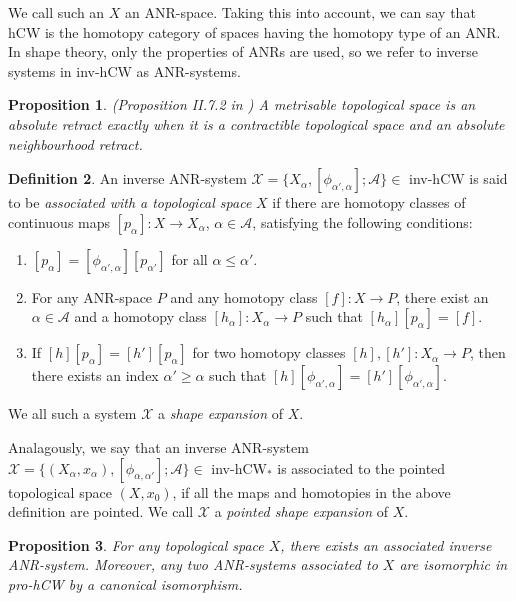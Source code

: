 \documentclass[a4paper,11pt]{article}
\theoremstyle{definition}
\newtheorem{definition}{Definition}[section]
\theoremstyle{plain}
\newtheorem{prop}[definition]{Proposition}
\theoremstyle{remark}
\begin{document}
{We call such an $X$ an ANR-space. Taking this into account, we can say that hCW is the homotopy category of spaces having the homotopy type of an ANR. In shape theory, only the properties of ANRs are used, so we refer to inverse systems in inv-hCW as ANR-systems. 

\begin{prop} (Proposition II.7.2 in \cite{sze1965theory}) A metrisable topological space is an absolute retract exactly when it is a contractible topological space and an absolute neighbourhood retract. 
\end{prop}

\begin{definition} \label{systemassocX} An inverse ANR-system $\mathcal{X} = \{X_{\alpha}, [\phi_{\alpha',\alpha}]; \mathcal{A}\} \in$ inv-hCW is said to be \textit{associated with a topological space} $X$ if there are homotopy classes of continuous maps $[p_{\alpha}]: X\rightarrow X_{\alpha}$, $\alpha\in \mathcal{A}$, satisfying the following conditions:
\begin{enumerate}
\item $[p_{\alpha}] = [\phi_{\alpha',\alpha}] [p_{\alpha'}]$ for all $\alpha \leq \alpha'$.
\item For any ANR-space $P$ and any homotopy class $[f]: X\rightarrow P$, there exist an $\alpha\in  \mathcal{A}$ and a homotopy class $[h_{\alpha}]: X_{\alpha}\rightarrow P$ such that $[h_{\alpha}][p_{\alpha}] = [f]$. 
\item If $[h] [p_{\alpha}] = [h'] [p_{\alpha}]$ for two homotopy classes $[h],[h']: X_{\alpha}\rightarrow P$, then there exists an index $\alpha'\geq \alpha$ such that $[h][\phi_{\alpha',\alpha}] = [h'] [\phi_{\alpha',\alpha}]$. 
\end{enumerate} 
We all such a system $\mathcal{X}$ a \textit{shape expansion} of $X$.
\end{definition}


Analagously, we say that an inverse ANR-system $\mathcal{X} = \{(X_{\alpha},x_{\alpha}), [\phi_{\alpha,\alpha'}]; \mathcal{A}\} \in$ inv-hCW$_{\ast}$ is associated to the pointed topological space $(X,x_0)$, if all the maps and homotopies in the above definition are pointed. We call $\mathcal{X}$ a \textit{pointed shape expansion} of $X$. 

\begin{prop} \label{prosystem} For any topological space $X$, there exists an associated inverse ANR-system. Moreover, any two ANR-systems associated to $X$ are isomorphic in pro-hCW by a canonical isomorphism. 
\end{prop}

}
\end{document}
